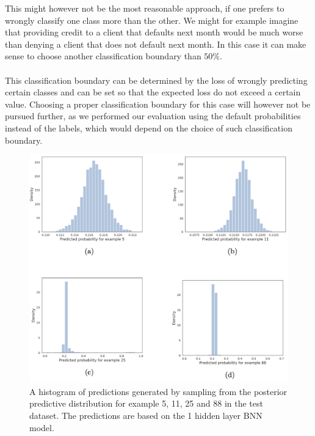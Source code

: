 This might however not be the most reasonable approach, if one prefers to wrongly classify one class more than the other. We might for example imagine that providing credit to a client that defaults next month would be much worse than denying a client that does not default next month. In this case it can make sense to choose another classification boundary than $50\%$. 
\\
\\
This classification boundary can be determined by the loss of wrongly predicting certain classes and can be set so that the expected loss do not exceed a certain value. Choosing a proper classification boundary for this case will however not be pursued further, as we performed our evaluation using the default probabilities instead of the labels, which would depend on the choice of such classification boundary.
  

\begin{figure}
    \centering
    \includegraphics[width=\textwidth]{pics/post_pred_credit.png}
    \caption{A histogram of predictions generated by sampling from the posterior predictive distribution for example 5, 11, 25 and 88 in the test dataset. The predictions are based on the 1 hidden layer BNN model.}
    \label{fig:ppc_credit}
\end{figure}


